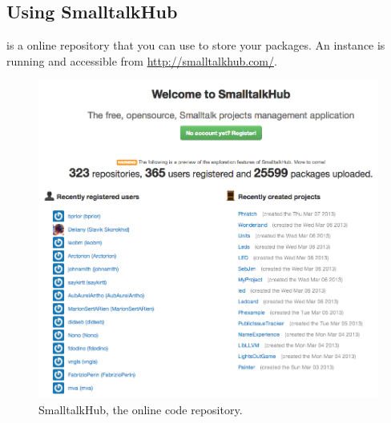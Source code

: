 \documentclass[a4paper,10pt,twoside]{book}
\begin{document}


\subsection{Using SmalltalkHub}

 is a online repository that you can use to store your \Mont packages. An instance is running and accessible from \url{http://smalltalkhub.com/}. %

\begin{figure}[ht]\centering
	\includegraphics[width=\textwidth]{squeaksource2}
	\caption{SmalltalkHub, the online \Mont code repository.}
\end{figure}

\end{document}
